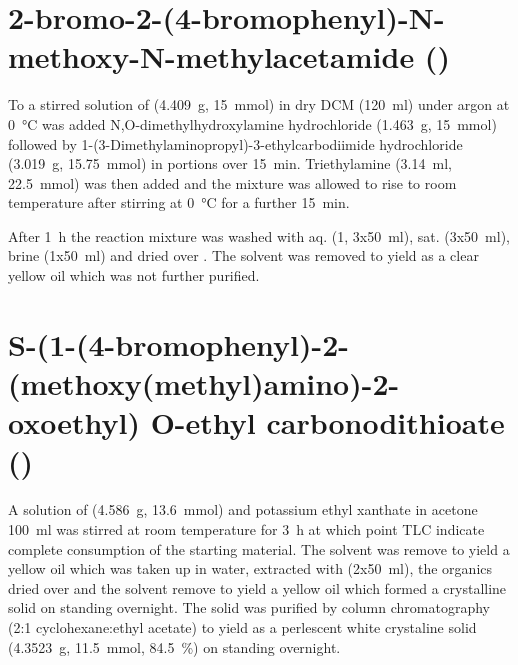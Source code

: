 
\section{2-bromo-2-(4-bromophenyl)-N-methoxy-N-methylacetamide ()}
To a stirred solution of  (\SI{4.409}{\gram}, \SI{15}{\milli\mol}) in dry DCM (\SI{120}{\milli\litre}) under argon at \SI{0}{\celsius} was added N,O-dimethylhydroxylamine hydrochloride (\SI{1.463}{\gram}, \SI{15}{\milli\mol}) followed by 1-(3-Dimethylaminopropyl)-3-ethylcarbodiimide hydrochloride (\SI{3.019}{\gram}, \SI{15.75}{\milli\mol}) in portions over \SI{15}{\minute}. Triethylamine (\SI{3.14}{\milli\litre}, \SI{22.5}{\milli\mol}) was then added and the mixture was allowed to rise to room temperature after stirring at \SI{0}{\celsius} for a further \SI{15}{\minute}.

After \SI{1}{\hour} the reaction mixture was washed with aq.  (\SI{1}{\Molar}, 3x\SI{50}{\milli\litre}), sat.  (3x\SI{50}{\milli\litre}), brine (1x\SI{50}{\milli\litre}) and dried over . The solvent was removed \invacuo to yield  as a clear yellow oil which was not further purified.


\section{S-(1-(4-bromophenyl)-2-(methoxy(methyl)amino)-2-oxoethyl) O-ethyl carbonodithioate ()}

A solution of  (\SI{4.586}{\gram}, \SI{13.6}{\milli\mol}) and potassium ethyl xanthate in acetone {\SI{100}{\milli\litre}} was  stirred at room temperature for \SI{3}{\hour} at which point TLC indicate complete consumption of the starting material. The solvent was remove \invacuo to yield a yellow oil which was taken up in water, extracted with  (2x\SI{50}{\milli\litre}), the organics dried over  and the solvent remove to yield a yellow oil which formed a crystalline solid on standing overnight. The solid was purified by column chromatography (2:1 cyclohexane:ethyl acetate) to yield  as a perlescent white crystaline solid (\SI{4.3523}{\gram}, \SI{11.5}{\milli\mol}, \SI{84.5}{\percent}) on standing overnight.

